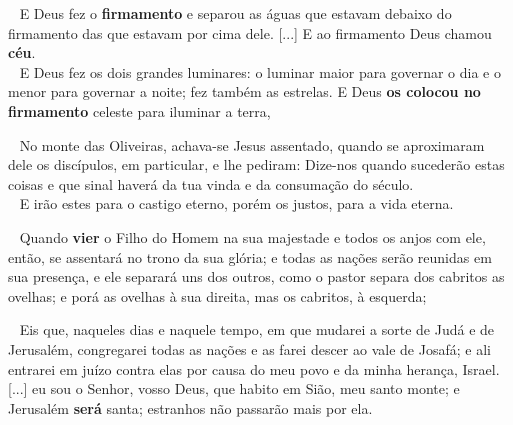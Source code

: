 \documentclass[12pt,aspectratio=169]{beamer}
\newcommand{\ver}[1]{%
    \raisebox{0.50ex}{%
        \scalebox{1.1}{%
            \pmb{\textbf{\textcolor{BSpbg}{#1}}}%
        }%
    }%
}
\newcommand{\QUOTE}[1]{%
    \par\noindent\hspace*{0.1\linewidth}%
    \begin{minipage}{0.8\linewidth}%
        \linespread{1.35}\large{#1}%
    \end{minipage}%
}
\newcommand{\RED}[1]{{\textcolor{TXred}{#1}}}
\newcommand{\ORA}[1]{{\textcolor{TXora}{#1}}}
\newcommand{\YEL}[1]{{\textcolor{TXyel}{#1}}}
\newcommand{\GRE}[1]{{\textcolor{TXgre}{#1}}}
\newcommand{\CYA}[1]{{\textcolor{TXcya}{#1}}}
\newcommand{\BLU}[1]{{\textcolor{TXblu}{#1}}}
\newcommand{\MAG}[1]{{\textcolor{TXmag}{#1}}}
\newcommand{\BRI}[1]{{\textcolor{BSpbg}{#1}}}   %
\begin{document}
    \begin{frame}
        \QUOTE{%
            \ver{(A21) Gn~1.7,8}~%
            E Deus fez o \YEL{\textbf{firmamento}} e  \ORA{separou}  as  águas  que  estavam
            debaixo do firmamento das que estavam por cima dele. [...] E \YEL{ao  firmamento
            Deus chamou \textbf{céu}}. \\[\bigskipamount]
            \ver{(A21) Gn~1.16,17}~%
            E Deus fez os \CYA{dois grandes luminares}: o luminar maior para governar o  dia
            e o  menor  para  governar  a  noite;  \MAG{fez  também  as  estrelas}.  E  Deus
            \GRE{\textbf{os colocou no firmamento} celeste} para iluminar a terra,
        }
    \end{frame}


    \begin{frame}
        \QUOTE{%
            \ver{(ARA) Mt~24.3}~%
            No monte das Oliveiras, achava-se Jesus assentado, quando se aproximaram dele os
            discípulos, \BRI{em particular}, e lhe pediram: Dize-nos  \YEL{quando  sucederão
            estas coisas} e \GRE{que sinal haverá da tua  vinda}  e  da  \MAG{consumação  do
            século}. \\[\bigskipamount]
            \ver{(ARA) Mt~25.46}~%
            E irão estes para o \RED{castigo eterno}, porém  os  justos,  para  a  \GRE{vida
            eterna}.
        }
    \end{frame}

    \begin{frame}
        \QUOTE{%
            \ver{(ARA) Mt~25.31--33}~%
            \YEL{Quando \textbf{vier}} o Filho do Homem na sua majestade e  todos  os  anjos
            com ele,  então,  se  assentará  no  \GRE{trono  da  sua  glória};  e  todas  as
            \CYA{nações serão reunidas em  sua  presença},  e  ele  \ORA{separará}  uns  dos
            outros, como o pastor separa dos cabritos as ovelhas; e porá as  ovelhas  à  sua
            \BLU{direita}, mas os cabritos, à \RED{esquerda};
        }
    \end{frame}

    \begin{frame}
        \QUOTE{%
            \ver{(ARA) Jl~3.1,2,17}~%
            Eis que, naqueles dias e naquele tempo, em que mudarei a sorte de  \YEL{Judá}  e
            de \ORA{Jerusalém}, congregarei \CYA{todas as  nações}  e  as  farei  descer  ao
            \GRE{vale de Josafá}; e ali \RED{entrarei em juízo contra elas} por causa do meu
            povo e da minha herança, Israel. [...] eu sou o  \BRI{Senhor,  vosso  Deus,  que
            habito em  Sião,  meu  santo  monte};  e  \ORA{Jerusalém  \textbf{será}  santa};
            estranhos não passarão mais por ela.
        }
    \end{frame}
\end{document}
